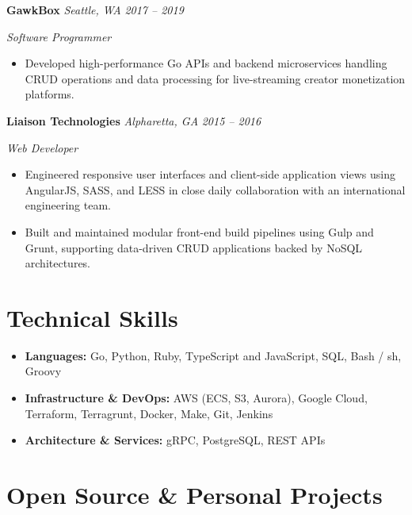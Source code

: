 \documentclass[10pt,letterpaper]{article}
\newcommand{\entry}[3]{%
  \noindent\textbf{\color{accentcolor}#1} \hfill \textit{#3} \quad \quad \textit{#2}\par
}
\newcommand{\role}[2]{%
  \noindent\textit{#1}\par
  \vspace{0.2em}
}
\begin{document}
\entry{GawkBox}{2017 -- 2019}{Seattle, WA}
\role{Software Programmer}{}
\begin{itemize}[leftmargin=1.2em, itemsep=0.25em]
    \item Developed high-performance Go APIs and backend microservices handling CRUD operations and data processing for live-streaming creator monetization platforms.
\end{itemize}

\entry{Liaison Technologies}{2015 -- 2016}{Alpharetta, GA}
\role{Web Developer}{}
\begin{itemize}[leftmargin=1.2em, itemsep=0.25em]
    \item Engineered responsive user interfaces and client-side application views using AngularJS, SASS, and LESS in close daily collaboration with an international engineering team.
    \item Built and maintained modular front-end build pipelines using Gulp and Grunt, supporting data-driven CRUD applications backed by NoSQL architectures.
\end{itemize}

\section{Technical Skills}
\begin{itemize}[leftmargin=1.2em, itemsep=0.2em]
        \item[] \textbf{Languages:} Go, Python, Ruby, TypeScript and JavaScript, SQL, Bash / sh, Groovy
        \item[] \textbf{Infrastructure \& DevOps:} AWS (ECS, S3, Aurora), Google Cloud, Terraform, Terragrunt, Docker, Make, Git, Jenkins
        \item[] \textbf{Architecture \& Services:} gRPC, PostgreSQL, REST APIs
\end{itemize}

\section{Open Source \& Personal Projects}
\end{document}
